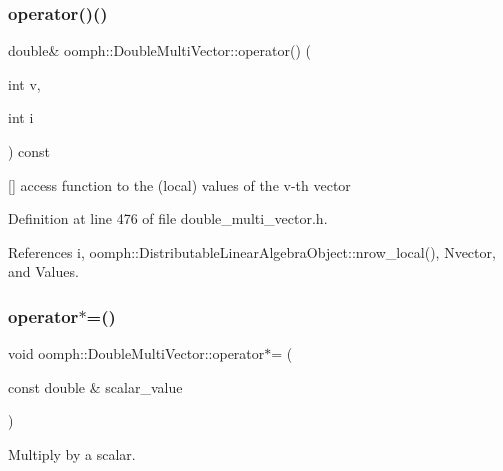 \mbox{\label{classoomph_1_1DoubleMultiVector_a6c3d82fb4be996cc1da79c1477a4a8c8}} 
\subsubsection{\texorpdfstring{operator()()}{operator()()}}
{\footnotesize\ttfamily double\& oomph\+::\+Double\+Multi\+Vector\+::operator() (\begin{DoxyParamCaption}\item[{int}]{v,  }\item[{int}]{i }\end{DoxyParamCaption}) const\hspace{0.3cm}{\ttfamily [inline]}}



\mbox{[}\mbox{]} access function to the (local) values of the v-\/th vector 



Definition at line 476 of file double\+\_\+multi\+\_\+vector.\+h.



References i, oomph\+::\+Distributable\+Linear\+Algebra\+Object\+::nrow\+\_\+local(), Nvector, and Values.

\mbox{\label{classoomph_1_1DoubleMultiVector_a4edb706ef2c1e5861a7f7310b5059f03}} 
\subsubsection{\texorpdfstring{operator$\ast$=()}{operator*=()}}
{\footnotesize\ttfamily void oomph\+::\+Double\+Multi\+Vector\+::operator$\ast$= (\begin{DoxyParamCaption}\item[{const double \&}]{scalar\+\_\+value }\end{DoxyParamCaption})\hspace{0.3cm}{\ttfamily [inline]}}



Multiply by a scalar. 



